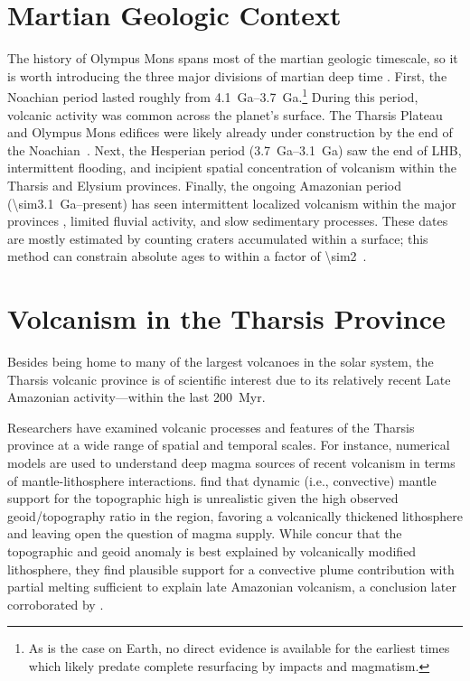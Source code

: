 \section{Martian Geologic Context}

The history of Olympus Mons spans most of the martian geologic timescale, so it is worth introducing the three major divisions of martian deep time \parencite{carr_geologic_2010}. First, the Noachian period lasted roughly from \qtyrange{4.1}{3.7}{Ga}.\footnote{As is the case on Earth, no direct evidence is available for the earliest times which likely predate complete resurfacing by impacts and magmatism.} During this period, volcanic activity was common across the planet's surface. The Tharsis Plateau and Olympus Mons edifices were likely already under construction by the end of the Noachian~\parencite[cf.][]{isherwood_volcanic_2013,broquet_gravitational_2019}. Next, the Hesperian period (\qtyrange{3.7}{3.1}{Ga}) saw the end of \acl{LHB}, intermittent flooding, and incipient spatial concentration of volcanism within the Tharsis and Elysium provinces. Finally, the ongoing Amazonian period (\qty{\sim3.1}{Ga}--present) has seen intermittent localized volcanism within the major provinces \parencite[e.g.,][]{grott_long-term_2013}, limited fluvial activity, and slow sedimentary processes. These dates are mostly estimated by counting craters accumulated within a surface; this method can constrain absolute ages to within a factor of \num{\sim2}~\parencite[e.g.,][]{kneissl_map-projection-independent_2011}.

\section{Volcanism in the Tharsis Province}

Besides being home to many of the largest volcanoes in the solar system, the Tharsis volcanic province is of scientific interest due to its relatively recent Late Amazonian activity---within the last \qty{200}{Myr}.

Researchers have examined volcanic processes and features of the Tharsis province at a wide range of spatial and temporal scales. For instance, numerical models are used to understand deep magma sources of recent volcanism in terms of mantle-lithosphere interactions. \textcite{roberts_plume-induced_2004} find that dynamic (i.e., convective) mantle support for the topographic high is unrealistic given the high observed geoid/topography ratio in the region, favoring a volcanically thickened lithosphere and leaving open the question of magma supply. While \textcite{redmond_numerical_2004} concur that the topographic and geoid anomaly is best explained by volcanically modified lithosphere, they find plausible support for a convective plume contribution with partial melting sufficient to explain late Amazonian volcanism, a conclusion later corroborated by \textcite{plesa_thermal_2018}.

